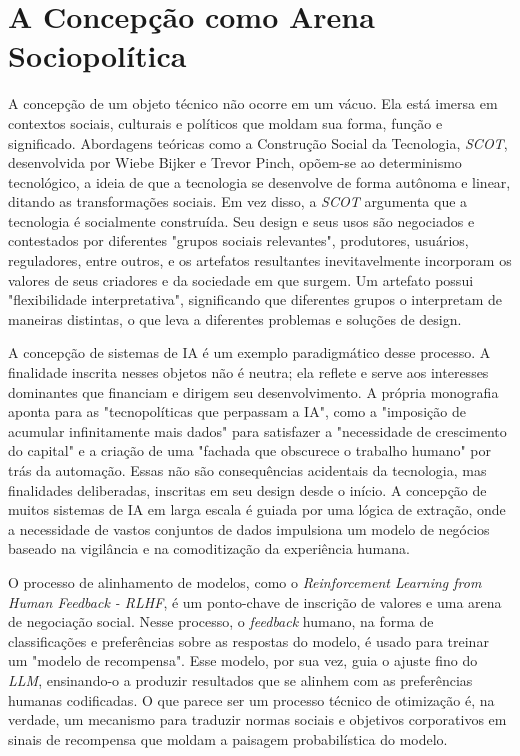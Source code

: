 \section{A Concepção como Arena Sociopolítica}\label{sec:concepcao_arena_sociopolitica}

A concepção de um objeto técnico não ocorre em um vácuo. Ela está imersa em contextos sociais, culturais e políticos que moldam sua forma, função e significado. Abordagens 
teóricas como a Construção Social da Tecnologia, \textit{SCOT}, desenvolvida por Wiebe Bijker e Trevor Pinch, opõem-se ao determinismo tecnológico, a ideia de que a tecnologia se 
desenvolve de forma autônoma e linear, ditando as transformações sociais. Em vez disso, a \textit{SCOT} argumenta que a tecnologia é socialmente construída. Seu design e seus usos são 
negociados e contestados por diferentes "grupos sociais relevantes", produtores, usuários, reguladores, entre outros, e os artefatos resultantes inevitavelmente incorporam os valores 
de seus criadores e da sociedade em que surgem. Um artefato possui "flexibilidade interpretativa", significando que diferentes grupos o interpretam de maneiras distintas, o que 
leva a diferentes problemas e soluções de design.   

A concepção de sistemas de IA é um exemplo paradigmático desse processo. A finalidade inscrita nesses objetos não é neutra; ela reflete e serve aos interesses dominantes que 
financiam e dirigem seu desenvolvimento. A própria monografia aponta para as "tecnopolíticas que perpassam a IA", como a "imposição de acumular infinitamente mais dados" para 
satisfazer a "necessidade de crescimento do capital" e a criação de uma "fachada que obscurece o trabalho humano" por trás da automação. Essas não são consequências acidentais 
da tecnologia, mas finalidades deliberadas, inscritas em seu design desde o início. A concepção de muitos sistemas de IA em larga escala é guiada por uma lógica de extração, 
onde a necessidade de vastos conjuntos de dados impulsiona um modelo de negócios baseado na vigilância e na comoditização da experiência humana.   

O processo de alinhamento de modelos, como o \textit{Reinforcement Learning from Human Feedback - RLHF}, é um ponto-chave de inscrição de valores e uma arena de negociação social. 
Nesse processo, o \textit{feedback} humano, na forma de classificações e preferências sobre as respostas do modelo, é usado para treinar um "modelo de recompensa". Esse modelo, 
por sua vez, guia o ajuste fino do \textit{LLM}, ensinando-o a produzir resultados que se alinhem com as preferências humanas codificadas. O que parece ser um processo técnico de 
otimização é, na verdade, um mecanismo para traduzir normas sociais e objetivos corporativos em sinais de recompensa que moldam a paisagem probabilística do modelo.   

